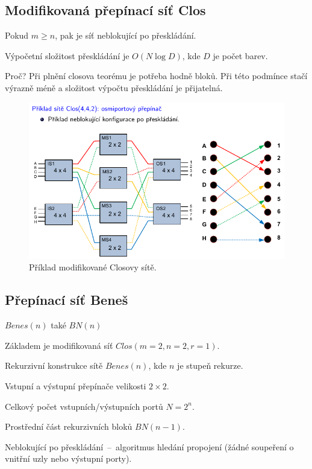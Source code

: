 \subsection{Modifikovaná přepínací síť Clos}

\begin{compactitem}
    \item Pokud $m \geq n$, pak je síť neblokující po přeskládání.
    \item Výpočetní složitost přeskládání je $O(N \log{D})$, kde $D$ je počet barev.
    \item Proč? Při plnění closova teorému je potřeba hodně bloků. Při této podmínce stačí výrazně méně a složitost výpočtu přeskládání je přijatelná.
\end{compactitem}

\begin{figure}[H]
    \centering
    \includegraphics[width=1\linewidth]{clos_modifikovany_priklad.pdf}
    \caption{Příklad modifikované Closovy sítě.}
\end{figure}

\subsection{Přepínací síť Beneš}

$Benes(n)$ také $BN(n)$
\begin{compactitem}
    \item Základem je modifikovaná síť $Clos(m=2, n=2, r=1)$.
    \item Rekurzivní konstrukce sítě $Benes(n)$, kde $n$ je stupeň rekurze.
    \item Vstupní a výstupní přepínače velikosti $2 \times 2$.
    \item Celkový počet vstupních/výstupních portů $N = 2^n$.
    \item Prostřední část rekurzivních bloků $BN(n-1)$.
    \item Neblokující po přeskládání~--~algoritmus hledání propojení (žádné soupeření o vnitřní uzly nebo výstupní porty).
\end{compactitem}

